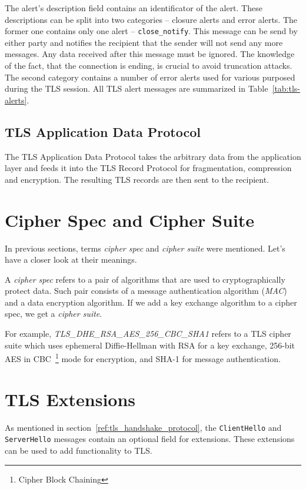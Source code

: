     The alert's description field contains an identificator of the alert.
    These descriptions can be split into two categories -- closure alerts
    and error alerts. The former one contains only one alert --
    \texttt{close\_notify}. This message can be send by either party and
    notifies the recipient that the
    sender will not send any more messages. Any data received after this message
    must be ignored. The knowledge of the fact, that the connection is ending,
    is crucial to avoid truncation attacks.
    The second category contains a number of error alerts used for various
    purposed during the TLS session. All TLS alert messages are summarized
    in Table~\ref{tab:tls-alerts}.

\subsection{TLS Application Data Protocol}
    The TLS Application Data Protocol takes the arbitrary data from the application
    layer and feeds it into the TLS Record Protocol for fragmentation, compression
    and encryption. The resulting TLS records are then sent to the recipient.

\section{Cipher Spec and Cipher Suite}
    In previous sections, terms \textit{cipher spec} and
    \textit{cipher suite} were mentioned. Let's have a closer look at their meanings.

    A \textit{cipher spec} refers to a pair of algorithms that are used
    to cryptographically protect data. Such pair consists of a message
    authentication algorithm (\textit{MAC}) and a data encryption algorithm. If we
    add a key exchange algorithm to a cipher spec, we get a \textit{cipher suite}.

    For example, \textit{TLS\_DHE\_RSA\_AES\_256\_CBC\_SHA1} refers to a TLS
    cipher suite which uses ephemeral Diffie-Hellman with RSA for a key
    exchange, 256-bit AES in CBC~\footnote{Cipher Block Chaining} mode for
    encryption, and SHA-1 for message authentication.

\section{TLS Extensions}
    As mentioned in section~\ref{ref:tls_handshake_protocol}, the \texttt{ClientHello}
    and \texttt{ServerHello} messages contain an optional field for extensions.
    These extensions can be used to add functionality to TLS.

